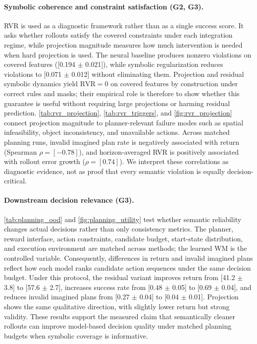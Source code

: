 \documentclass{article}
\theoremstyle{plain}
\theoremstyle{definition}
\theoremstyle{remark}
\begin{document}
\paragraph{Symbolic coherence and constraint satisfaction (G2, G3).}
RVR is used as a diagnostic framework rather than as a single success score. It asks whether rollouts satisfy the covered constraints under each integration regime, while projection magnitude measures how much intervention is needed when hard projection is used. The neural baseline produces nonzero violations on covered features ([0.194 $\pm$ 0.021]), while symbolic regularization reduces violations to [0.071 $\pm$ 0.012] without eliminating them. Projection and residual symbolic dynamics yield $\mathrm{RVR}=0$ on covered features by construction under correct rules and masks; their empirical role is therefore to show whether this guarantee is useful without requiring large projections or harming residual prediction. \autoref{tab:rvr_projection}, \autoref{tab:rvr_triggers}, and \autoref{fig:rvr_projection} connect projection magnitude to planner-relevant failure modes such as spatial infeasibility, object inconsistency, and unavailable actions. Across matched planning runs, invalid imagined plan rate is negatively associated with return (Spearman $\rho=[-0.78]$), and horizon-averaged RVR is positively associated with rollout error growth ($\rho=[0.74]$). We interpret these correlations as diagnostic evidence, not as proof that every semantic violation is equally decision-critical.

\paragraph{Downstream decision relevance (G3).}
\autoref{tab:planning_ood} and \autoref{fig:planning_utility} test whether semantic reliability changes actual decisions rather than only consistency metrics. The planner, reward interface, action constraints, candidate budget, start-state distribution, and execution environment are matched across methods; the learned WM is the controlled variable. Consequently, differences in return and invalid imagined plans reflect how each model ranks candidate action sequences under the same decision budget. Under this protocol, the residual variant improves return from [41.2 $\pm$ 3.8] to [57.6 $\pm$ 2.7], increases success rate from [0.48 $\pm$ 0.05] to [0.69 $\pm$ 0.04], and reduces invalid imagined plans from [0.27 $\pm$ 0.04] to [0.04 $\pm$ 0.01]. Projection shows the same qualitative direction, with slightly lower return but strong validity. These results support the measured claim that semantically cleaner rollouts can improve model-based decision quality under matched planning budgets when symbolic coverage is informative.
\end{document}
